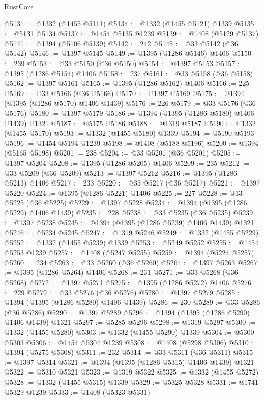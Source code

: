 \begin{lexlean}{RustCore}
\begin{coremodule}
@5131 := @1332 (@1455 @5111)
@5134 := @1332 (@1455 @5121) @1339
@5135 := @5131 @5134
@5137 := @1454 @5135 @1239
@5139 := @1408 (@5129 @5137)
@5141 := @1394 (@5106 @5139)
@5142 := 242
@5145 := @33 @5142 (@36 @5142)
@5146 := @1397 @5145
@5149 := @1395 (@1286 @5146) @1406
@5150 := 239
@5153 := @33 @5150 (@36 @5150)
@5154 := @1397 @5153
@5157 := @1395 (@1286 @5154) @1406
@5158 := 237
@5161 := @33 @5158 (@36 @5158)
@5162 := @1397 @5161
@5165 := @1395 (@1286 @5162) @1406
@5166 := 225
@5169 := @33 @5166 (@36 @5166)
@5170 := @1397 @5169
@5175 := @1394 (@1395 (@1286 @5170) @1406 @1439)
@5176 := 226
@5179 := @33 @5176 (@36 @5176)
@5180 := @1397 @5179
@5186 := @1394 (@1395 (@1286 @5180) @1406 @1439) @1321
@5187 := @5175 @5186
@5188 := @1319 @5187
@5190 := @1332 (@1455 @5170)
@5193 := @1332 (@1455 @5180) @1339
@5194 := @5190 @5193
@5196 := @1454 @5194 @1239
@5198 := @1408 (@5188 @5196)
@5200 := @1394 (@5165 @5198)
@5201 := 238
@5204 := @33 @5201 (@36 @5201)
@5205 := @1397 @5204
@5208 := @1395 (@1286 @5205) @1406
@5209 := 235
@5212 := @33 @5209 (@36 @5209)
@5213 := @1397 @5212
@5216 := @1395 (@1286 @5213) @1406
@5217 := 233
@5220 := @33 @5217 (@36 @5217)
@5221 := @1397 @5220
@5224 := @1395 (@1286 @5221) @1406
@5225 := 227
@5228 := @33 @5225 (@36 @5225)
@5229 := @1397 @5228
@5234 := @1394 (@1395 (@1286 @5229) @1406 @1439)
@5235 := 228
@5238 := @33 @5235 (@36 @5235)
@5239 := @1397 @5238
@5245 := @1394 (@1395 (@1286 @5239) @1406 @1439) @1321
@5246 := @5234 @5245
@5247 := @1319 @5246
@5249 := @1332 (@1455 @5229)
@5252 := @1332 (@1455 @5239) @1339
@5253 := @5249 @5252
@5255 := @1454 @5253 @1239
@5257 := @1408 (@5247 @5255)
@5259 := @1394 (@5224 @5257)
@5260 := 234
@5263 := @33 @5260 (@36 @5260)
@5264 := @1397 @5263
@5267 := @1395 (@1286 @5264) @1406
@5268 := 231
@5271 := @33 @5268 (@36 @5268)
@5272 := @1397 @5271
@5275 := @1395 (@1286 @5272) @1406
@5276 := 229
@5279 := @33 @5276 (@36 @5276)
@5280 := @1397 @5279
@5285 := @1394 (@1395 (@1286 @5280) @1406 @1439)
@5286 := 230
@5289 := @33 @5286 (@36 @5286)
@5290 := @1397 @5289
@5296 := @1394 (@1395 (@1286 @5290) @1406 @1439) @1321
@5297 := @5285 @5296
@5298 := @1319 @5297
@5300 := @1332 (@1455 @5280)
@5303 := @1332 (@1455 @5290) @1339
@5304 := @5300 @5303
@5306 := @1454 @5304 @1239
@5308 := @1408 (@5298 @5306)
@5310 := @1394 (@5275 @5308)
@5311 := 232
@5314 := @33 @5311 (@36 @5311)
@5315 := @1397 @5314
@5321 := @1394 (@1395 (@1286 @5315) @1406 @1439) @1321
@5322 := @5310 @5321
@5323 := @1319 @5322
@5325 := @1332 (@1455 @5272)
@5328 := @1332 (@1455 @5315) @1339
@5329 := @5325 @5328
@5331 := @1741 @5329 @1239
@5333 := @1408 (@5323 @5331)

\end{coremodule}
\end{lexlean}
